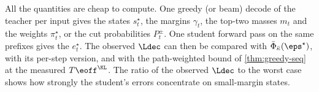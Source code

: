 \begin{remark}\label{rem:measure-decoding}
All the quantities are cheap to compute. One greedy (or beam) decode of the teacher per input gives the
states $s^\star_t$, the margins $\gamma_t$, the top-two masses $m_t$ and the weights $\pi^\star_t$, or the cut probabilities
$P^\pm_t$. One student forward pass on the same prefixes gives the $e^\star_t$. The observed $\Ldec$ can then be
compared with $\bar\Phi_{\bar\kappa}(\eps^\star)$, with its per-step version, and with the path-weighted bound of
\cref{thm:greedy-seq} at the measured $T\eoff^{\KL}$. The ratio of the observed $\Ldec$ to the worst case shows how
strongly the student's errors concentrate on small-margin states.
\end{remark}
